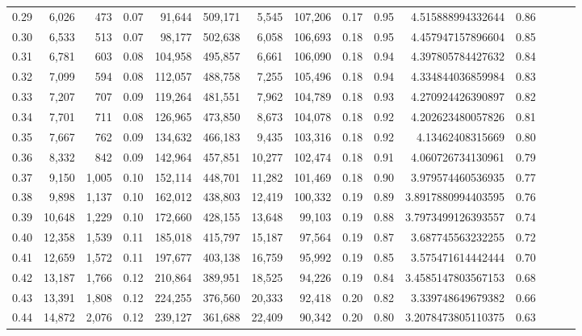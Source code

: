 \begin{tabular}{rrrrrrrrrrrrrrr}
0.29 &   6,026 &    473 &  0.07 &   91,644 &  509,171 &    5,545 &  107,206 &  0.17 &  0.95 &       4.515888994332644 &      0.86 \\
0.30 &   6,533 &    513 &  0.07 &   98,177 &  502,638 &    6,058 &  106,693 &  0.18 &  0.95 &       4.457947157896604 &      0.85 \\
0.31 &   6,781 &    603 &  0.08 &  104,958 &  495,857 &    6,661 &  106,090 &  0.18 &  0.94 &       4.397805784427632 &      0.84 \\
0.32 &   7,099 &    594 &  0.08 &  112,057 &  488,758 &    7,255 &  105,496 &  0.18 &  0.94 &       4.334844036859984 &      0.83 \\
0.33 &   7,207 &    707 &  0.09 &  119,264 &  481,551 &    7,962 &  104,789 &  0.18 &  0.93 &       4.270924426390897 &      0.82 \\
0.34 &   7,701 &    711 &  0.08 &  126,965 &  473,850 &    8,673 &  104,078 &  0.18 &  0.92 &       4.202623480057826 &      0.81 \\
0.35 &   7,667 &    762 &  0.09 &  134,632 &  466,183 &    9,435 &  103,316 &  0.18 &  0.92 &        4.13462408315669 &      0.80 \\
0.36 &   8,332 &    842 &  0.09 &  142,964 &  457,851 &   10,277 &  102,474 &  0.18 &  0.91 &       4.060726734130961 &      0.79 \\
0.37 &   9,150 &  1,005 &  0.10 &  152,114 &  448,701 &   11,282 &  101,469 &  0.18 &  0.90 &       3.979574460536935 &      0.77 \\
0.38 &   9,898 &  1,137 &  0.10 &  162,012 &  438,803 &   12,419 &  100,332 &  0.19 &  0.89 &      3.8917880994403595 &      0.76 \\
0.39 &  10,648 &  1,229 &  0.10 &  172,660 &  428,155 &   13,648 &   99,103 &  0.19 &  0.88 &      3.7973499126393557 &      0.74 \\
0.40 &  12,358 &  1,539 &  0.11 &  185,018 &  415,797 &   15,187 &   97,564 &  0.19 &  0.87 &       3.687745563232255 &      0.72 \\
0.41 &  12,659 &  1,572 &  0.11 &  197,677 &  403,138 &   16,759 &   95,992 &  0.19 &  0.85 &       3.575471614442444 &      0.70 \\
0.42 &  13,187 &  1,766 &  0.12 &  210,864 &  389,951 &   18,525 &   94,226 &  0.19 &  0.84 &      3.4585147803567153 &      0.68 \\
0.43 &  13,391 &  1,808 &  0.12 &  224,255 &  376,560 &   20,333 &   92,418 &  0.20 &  0.82 &       3.339748649679382 &      0.66 \\
0.44 &  14,872 &  2,076 &  0.12 &  239,127 &  361,688 &   22,409 &   90,342 &  0.20 &  0.80 &      3.2078473805110375 &      0.63 \\

\end{tabular}
